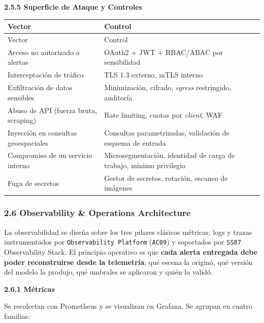 \documentclass{article}
\newcommand{\mdhfour}[1]{\par\medskip\noindent\textbf{#1}\par\nobreak\smallskip}
\begin{document}
\mdhfour{2.5.5 Superficie de Ataque y Controles}

{\small
\begin{longtable}{@{}L{2.29in}L{3.93in}@{}}
\toprule
Vector & Control \\
\midrule
\endfirsthead
\toprule
Vector & Control \\
\midrule
\endhead
\bottomrule
\endlastfoot
Acceso no autorizado a alertas & OAuth2 + JWT + RBAC/ABAC por sensibilidad \\
Interceptación de tráfico & TLS 1.3 externo, mTLS interno \\
Exfiltración de datos sensibles & Minimización, cifrado, \emph{egress} restringido, auditoría \\
Abuso de API (fuerza bruta, scraping) & Rate limiting, cuotas por \emph{client}, WAF \\
Inyección en consultas geoespaciales & Consultas parametrizadas, validación de esquema de entrada \\
Compromiso de un servicio interno & Microsegmentación, identidad de carga de trabajo, mínimo privilegio \\
Fuga de secretos & Gestor de secretos, rotación, escaneo de imágenes \\
\end{longtable}
}

\subsubsection{2.6 Observability \& Operations Architecture}

La observabilidad se diseña sobre los tres pilares clásicos \textemdash{}métricas, logs y trazas\textemdash{} instrumentados por \texttt{Observability Platform} (\texttt{AC09}) y soportados por \texttt{SS07} Observability Stack. El principio operativo es que \textbf{cada alerta entregada debe poder reconstruirse desde la telemetría}: qué escena la originó, qué versión del modelo la produjo, qué umbrales se aplicaron y quién la validó.

\mdhfour{2.6.1 Métricas}

Se recolectan con Prometheus y se visualizan en Grafana. Se agrupan en cuatro familias:
\end{document}
